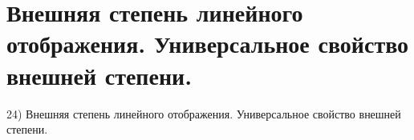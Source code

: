 \section{
 Внешняя степень линейного отображения. Универсальное свойство внешней степени.
}

24) Внешняя степень линейного отображения. Универсальное свойство внешней степени.
